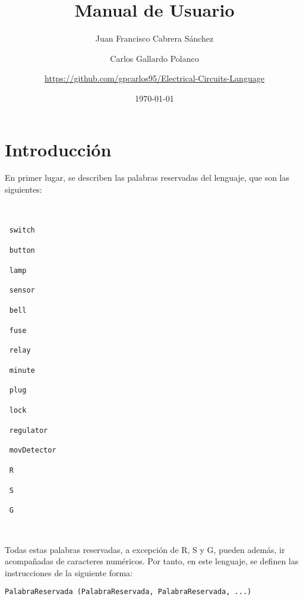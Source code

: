 \documentclass{article}
\author{Juan Francisco Cabrera Sánchez \and Carlos Gallardo Polanco \and \newline \url{https://github.com/gpcarlos95/Electrical-Circuits-Language}}
\title{Manual de Usuario}
\date{\today}
\begin{document}
\maketitle

\section{Introducción}

En primer lugar, se describen las palabras reservadas del lenguaje, que son las siguientes:

\

\begin{center}
\begin{enumerate*}
  \item[$\ $]\texttt{switch}
  \item[$\ $]\texttt{button}
  \item[$\ $]\texttt{lamp}
  \item[$\ $]\texttt{sensor}
  \item[$\ $]\texttt{bell}
  \item[$\ $]\texttt{fuse}
  \item[$\ $]\texttt{relay}
\end{enumerate*}
\end{center}

\begin{center}
  \begin{enumerate*}
  \item[$\ $]\texttt{minute}
  \item[$\ $]\texttt{plug}
  \item[$\ $]\texttt{lock}
  \item[$\ $]\texttt{regulator}
  \item[$\ $]\texttt{movDetector}
  \item[$\ $]\texttt{R}
  \item[$\ $]\texttt{S}
  \item[$\ $]\texttt{G}
  \end{enumerate*}
\end{center}

\

Todas estas palabras reservadas, a excepción de R, S y G, pueden además, ir acompañadas de caracteres numéricos. Por tanto, en este lenguaje, se definen las instrucciones de la siguiente forma:

\begin{center} \texttt{PalabraReservada  (PalabraReservada, PalabraReservada, ...)} \end{center}
\end{document}

